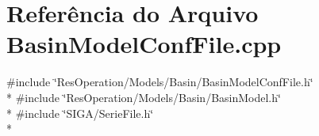 \section{Referência do Arquivo Basin\+Model\+Conf\+File.\+cpp}
\label{_basin_model_conf_file_8cpp}
{\ttfamily \#include \char`\"{}Res\+Operation/\+Models/\+Basin/\+Basin\+Model\+Conf\+File.\+h\char`\"{}}\\*
{\ttfamily \#include \char`\"{}Res\+Operation/\+Models/\+Basin/\+Basin\+Model.\+h\char`\"{}}\\*
{\ttfamily \#include \char`\"{}S\+I\+G\+A/\+Serie\+File.\+h\char`\"{}}\\*
